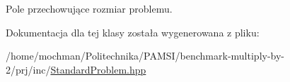 Pole przechowujące rozmiar problemu. 



Dokumentacja dla tej klasy została wygenerowana z pliku\-:\begin{DoxyCompactItemize}
\item 
/home/mochman/\-Politechnika/\-P\-A\-M\-S\-I/benchmark-\/multiply-\/by-\/2/prj/inc/\hyperlink{_standard_problem_8hpp}{Standard\-Problem.\-hpp}\end{DoxyCompactItemize}
